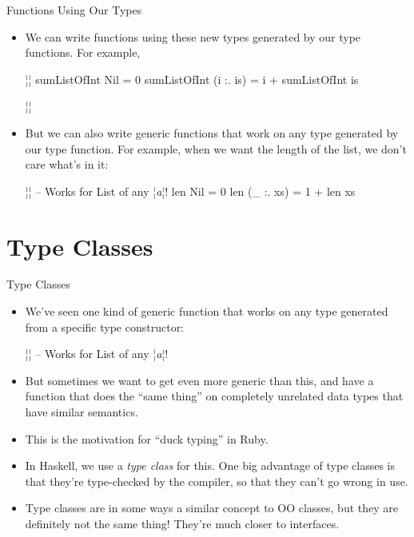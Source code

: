\documentclass[xcolor=dvipsnames]{beamer}          %
\newcommand{\lO}[1]{\color{Black}{#1}}
\newcommand{\lT}[1]{\color{Fuchsia}{#1}}        %
\begin{document}
\begin{frame}[fragile]{Functions Using Our Types}
\begin{itemize}
    \item We can write functions using these new types generated by our
        type functions. For example,
        \begin{hlisting}
            ¦\lT{sumListOfInt :: List Int -> Int}¦
            sumListOfInt Nil = 0
            sumListOfInt (i :. is) = i + sumListOfInt is

            ¦\lO{sumListOfInt (3 :. 7 :. 12 :. Nil)}¦
        \end{hlisting}
    \item But we can also write generic functions that work on any type
        generated by our type function. For example, when we want the
        length of the list, we don't care what's in it:
        \begin{hlisting}
            ¦\lT{len :: List a -> Int}¦  -- Works for List of any ¦\emph{a}¦!
            len Nil = 0
            len (_ :. xs) = 1 + len xs
        \end{hlisting}
\end{itemize}
\end{frame}


\section{Type Classes}

\begin{frame}[fragile]{Type Classes}
\begin{itemize}
    \item We've seen one kind of generic function that works on
        any type generated from a specific type constructor:
        \begin{hlisting}
            ¦\lT{len :: List a -> Int}¦  -- Works for List of any ¦\emph{a}¦!
        \end{hlisting}
    \item But sometimes we want to get even more generic than this,
        and have a function that does the ``same thing'' on completely
        unrelated data types that have similar semantics.
    \item This is the motivation for ``duck typing'' in Ruby.
    \item In Haskell, we use a \emph{type class} for this. One big
        advantage of type classes is that they're type-checked by the
        compiler, so that they can't go wrong in use.
    \item Type classes are in some ways a similar concept to OO classes,
        but they are definitely not the same thing! They're much closer
        to interfaces.
\end{itemize}
\end{frame}
\end{document}
